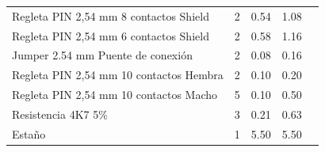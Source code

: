 \begin{table}[H]
\begin{tabular}{|l|l|l|l|l}
		Regleta PIN 2,54 mm 8 contactos Shield                          & 2                                         & 0.54                                                                                                                & 1.08                                                                                                             &  \\ \cline{1-4}
		Regleta PIN 2,54 mm 6 contactos Shield                          & 2                                         & 0.58                                                                                                                & 1.16                                                                                                             &  \\ \cline{1-4}
		Jumper 2.54 mm Puente de conexión                               & 2                                         & 0.08                                                                                                                & 0.16                                                                                                             &  \\ \cline{1-4}
		Regleta PIN 2,54 mm 10 contactos Hembra                         & 2                                         & 0.10                                                                                                                & 0.20                                                                                                             &  \\ \cline{1-4}
		Regleta PIN 2,54 mm 10 contactos Macho                          & 5                                         & 0.10                                                                                                                & 0.50                                                                                                             &  \\ \cline{1-4}
		Resistencia 4K7 5\%                                             & 3                                         & 0.21                                                                                                                & 0.63                                                                                                             &  \\ \cline{1-4}
		Estaño                                                          & 1                                         & 5.50                                                                                                                & 5.50                                                                                                             &  \\ \cline{1-4}

\end{tabular}
\end{table}
